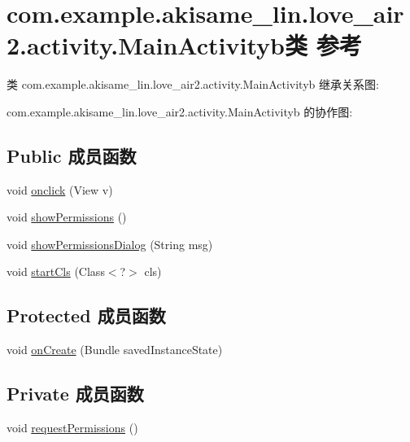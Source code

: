 \hypertarget{classcom_1_1example_1_1akisame__lin_1_1love__air2_1_1activity_1_1_main_activityb}{}\section{com.\+example.\+akisame\+\_\+lin.\+love\+\_\+air2.\+activity.\+Main\+Activityb类 参考}
\label{classcom_1_1example_1_1akisame__lin_1_1love__air2_1_1activity_1_1_main_activityb}


类 com.\+example.\+akisame\+\_\+lin.\+love\+\_\+air2.\+activity.\+Main\+Activityb 继承关系图\+:


com.\+example.\+akisame\+\_\+lin.\+love\+\_\+air2.\+activity.\+Main\+Activityb 的协作图\+:
\subsection*{Public 成员函数}
\begin{DoxyCompactItemize}
\item 
void \mbox{\hyperlink{classcom_1_1example_1_1akisame__lin_1_1love__air2_1_1activity_1_1_main_activityb_a536a4eaf6f7f132437f02923bf69a0ff}{onclick}} (View v)
\item 
void \mbox{\hyperlink{classcom_1_1example_1_1akisame__lin_1_1love__air2_1_1activity_1_1_main_activityb_a144afd6ebe4b812e807c9b920b05086a}{show\+Permissions}} ()
\item 
void \mbox{\hyperlink{classcom_1_1example_1_1akisame__lin_1_1love__air2_1_1activity_1_1_main_activityb_a2c4d4e1d01001d2a7387710b2b0faadb}{show\+Permissions\+Dialog}} (String msg)
\item 
void \mbox{\hyperlink{classcom_1_1example_1_1akisame__lin_1_1love__air2_1_1activity_1_1_main_activityb_a40ae8f1a7f41fbf8548a45966235595f}{start\+Cls}} (Class$<$?$>$ cls)
\end{DoxyCompactItemize}
\subsection*{Protected 成员函数}
\begin{DoxyCompactItemize}
\item 
void \mbox{\hyperlink{classcom_1_1example_1_1akisame__lin_1_1love__air2_1_1activity_1_1_main_activityb_af70f21029094274a1ba5de1b7a4420de}{on\+Create}} (Bundle saved\+Instance\+State)
\end{DoxyCompactItemize}
\subsection*{Private 成员函数}
\begin{DoxyCompactItemize}
\item 
void \mbox{\hyperlink{classcom_1_1example_1_1akisame__lin_1_1love__air2_1_1activity_1_1_main_activityb_ad4fe8b0dd01e16fd15d0e2cf82008a7a}{request\+Permissions}} ()
\end{DoxyCompactItemize}
